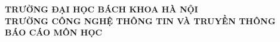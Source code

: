 \newcommand{\underwrite}[3][]{%
  \genfrac{}{}{#1}{}{\textstyle #2}{\scriptstyle #3}
}
\begin{titlepage}
\thispagestyle{empty}


\begin{center}

{\textbf{\large{TRƯỜNG ĐẠI HỌC BÁCH KHOA HÀ NỘI}}}\\[0.5cm]
{\textbf{\large{TRƯỜNG CÔNG NGHỆ THÔNG TIN VÀ TRUYỀN THÔNG}}}\\[4cm]

{\textbf{\huge{ BÁO CÁO MÔN HỌC}}}\\[0.3cm]
\huge{}\\[1cm]
{\textbf{\Large{}}\\[0.6cm]


\vspace{2cm}
\begin{table}[H]
\centering
{}
\end{table}}
\end{center}
\end{titlepage}
\thispagestyle{empty}